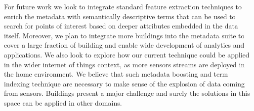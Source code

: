 For future work we look to integrate standard feature extraction techniques to enrich the metadata
with semantically descriptive terms that can be used to search for points of interest based on
deeper attributes embedded in the data itself.  Moreover, we plan to integrate more buildings
into the metadata suite to cover a large fraction of building and enable wide development
of analytics and applications.  We also look to explore how our current technique could be applied in the 
wider internet of things context, as more sensors streams are deployed in the home environment.
We believe that such metadata boosting and term indexing technique are necessary to make sense of
the explosion of data coming from sensors.  Buildings present a major challenge and surely the solutions
in this space can be applied in other domains.


